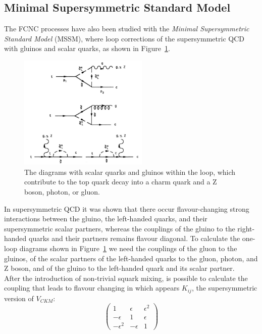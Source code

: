 \subsection{Minimal Supersymmetric Standard Model}
The FCNC processes have also been studied with the \textit{Minimal Supersymmetric Standard Model} (MSSM), where loop corrections of the supersymmetric QCD with gluinos 
and scalar quarks, as shown in Figure~\ref{fig:fey_mssm}.
\begin{figure}[!h]
	\centering
	\includegraphics[width=0.55\textwidth]{Chapters/CH1/figures/fey_mssm}
	\caption{The diagrams with scalar quarks and gluinos within the loop, which contribute to the top quark decay into a charm quark and a Z boson, photon, or gluon\cite{coulture_mssm}.}
	\label{fig:fey_mssm}
\end{figure}
In supersymmetric QCD it was shown that there occur flavour-changing strong interactions between the gluino, the left-handed quarks, and their supersymmetric scalar
partners, whereas the couplings of the gluino to the right-handed quarks and their partners remains flavour diagonal.
To calculate the one-loop diagrams shown in Figure~\ref{fig:fey_mssm} we need the couplings of the gluon to the gluinos, of the
scalar partners of the left-handed quarks to the gluon, photon, and Z boson, and of the gluino to the left-handed quark and its scalar partner.\\
After the introduction of non-trivial squark mixing, is possible to calculate the coupling that leads to flavour changing in which appears $K_{ij}$, the supersymmetric version of $V_{CKM}$:
\begin{equation}
\begin{pmatrix}
	1                  & \epsilon   & \epsilon^2 \\ 
	-\epsilon     & 1              & \epsilon \\ 
	-\epsilon^2 & -\epsilon & 1
\end{pmatrix} 
\end{equation}
